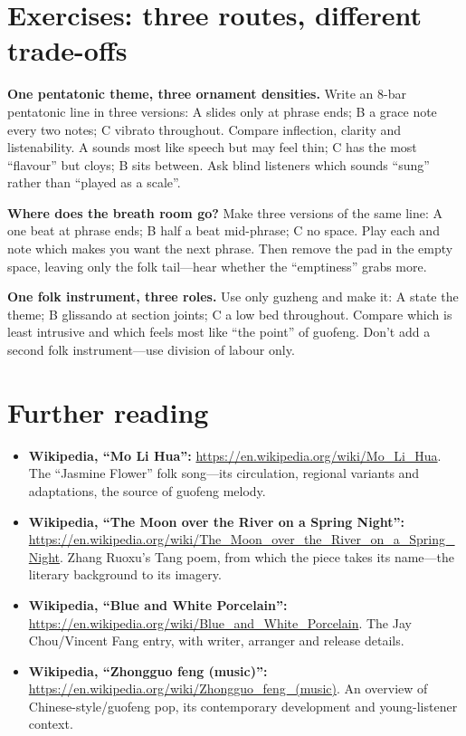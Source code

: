\section{Exercises: three routes, different trade-offs}
\label{sec:guofeng-practice}

\begin{exercise}
\textbf{One pentatonic theme, three ornament densities.} Write an 8-bar pentatonic line in three versions: A slides only at phrase ends; B a grace note every two notes; C vibrato throughout. Compare inflection, clarity and listenability. A sounds most like speech but may feel thin; C has the most ``flavour'' but cloys; B sits between. Ask blind listeners which sounds ``sung'' rather than ``played as a scale''.
\end{exercise}

\begin{exercise}
\textbf{Where does the breath room go?} Make three versions of the same line: A one beat at phrase ends; B half a beat mid-phrase; C no space. Play each and note which makes you want the next phrase. Then remove the pad in the empty space, leaving only the folk tail---hear whether the ``emptiness'' grabs more.
\end{exercise}

\begin{exercise}
\textbf{One folk instrument, three roles.} Use only guzheng and make it: A state the theme; B glissando at section joints; C a low bed throughout. Compare which is least intrusive and which feels most like ``the point'' of guofeng. Don't add a second folk instrument---use division of labour only.
\end{exercise}

\section{Further reading}
\label{sec:guofeng-reading}

\begin{sloppypar}
\begin{itemize}
\item \textbf{Wikipedia, ``Mo Li Hua'':} \url{https://en.wikipedia.org/wiki/Mo_Li_Hua}. The ``Jasmine Flower'' folk song---its circulation, regional variants and adaptations, the source of guofeng melody.
\item \textbf{Wikipedia, ``The Moon over the River on a Spring Night'':} \url{https://en.wikipedia.org/wiki/The_Moon_over_the_River_on_a_Spring_Night}. Zhang Ruoxu's Tang poem, from which the piece takes its name---the literary background to its imagery.
\item \textbf{Wikipedia, ``Blue and White Porcelain'':} \url{https://en.wikipedia.org/wiki/Blue_and_White_Porcelain}. The Jay Chou/Vincent Fang entry, with writer, arranger and release details.
\item \textbf{Wikipedia, ``Zhongguo feng (music)'':} \url{https://en.wikipedia.org/wiki/Zhongguo_feng_(music)}. An overview of Chinese-style/guofeng pop, its contemporary development and young-listener context.
\end{itemize}
\end{sloppypar}

